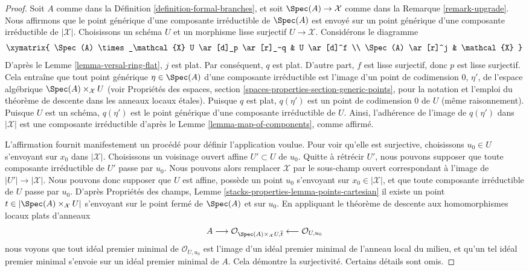 \begin{proof}
Soit $A$ comme dans la Définition \ref{definition-formal-branches}, et
soit $\Spec(A) \to \mathcal{X}$ comme dans la Remarque \ref{remark-upgrade}.
Nous affirmons que le point générique d'une composante irréductible de
$\Spec(A)$ est envoyé sur un point générique d'une composante irréductible
de $|\mathcal{X}|$. Choisissons un schéma $U$ et un morphisme
lisse surjectif $U \to \mathcal{X}$. Considérons le diagramme
$$
\xymatrix{
\Spec(A) \times_\mathcal{X} U \ar[d]_p \ar[r]_-q & U \ar[d]^f \\
\Spec(A) \ar[r]^j & \mathcal{X}
}
$$
D'après le Lemme \ref{lemma-versal-ring-flat}, $j$ est plat.
Par conséquent, $q$ est plat. D'autre part, $f$ est lisse surjectif,
donc $p$ est lisse surjectif. Cela entraîne que tout point générique
$\eta \in \Spec(A)$ d'une composante irréductible est l'image d'un
point de codimension $0$, $\eta'$, de l'espace algébrique
$\Spec(A) \times_\mathcal{X} U$ (voir
Propriétés des espaces, section \ref{spaces-properties-section-generic-points},
pour la notation et l'emploi du théorème de descente dans les anneaux locaux étales).
Puisque $q$ est plat, $q(\eta')$ est un point de codimension $0$ de $U$
(même raisonnement).
Puisque $U$ est un schéma, $q(\eta')$ est le point générique
d'une composante irréductible de $U$. Ainsi, l'adhérence de l'image
de $q(\eta')$ dans $|\mathcal{X}|$ est une composante irréductible
d'après le Lemme \ref{lemma-map-of-components}, comme affirmé.

\medskip\noindent
L'affirmation fournit manifestement un procédé pour définir l'application voulue.
Pour voir qu'elle est surjective, choisissons $u_0 \in U$ s'envoyant sur
$x_0$ dans $|\mathcal{X}|$. Choisissons un voisinage ouvert affine $U' \subset U$
de $u_0$. Quitte à rétrécir $U'$, nous pouvons supposer que toute
composante irréductible de $U'$ passe par $u_0$. Nous pouvons alors
remplacer $\mathcal{X}$ par le sous-champ ouvert correspondant à
l'image de $|U'| \to |\mathcal{X}|$. Nous pouvons donc supposer que $U$ est affine,
possède un point $u_0$ s'envoyant sur $x_0 \in |\mathcal{X}|$,
et que toute composante irréductible de $U$ passe par $u_0$.
D'après Propriétés des champs, Lemme
\ref{stacks-properties-lemma-points-cartesian}
il existe un point $t \in |\Spec(A) \times_\mathcal{X} U|$
s'envoyant sur le point fermé de $\Spec(A)$ et sur $u_0$.
En appliquant le théorème de descente aux homomorphismes locaux plats d'anneaux
$$
A \longrightarrow
\mathcal{O}_{\Spec(A) \times_\mathcal{X} U, \overline{t}}
\longleftarrow \mathcal{O}_{U, u_0}
$$
nous voyons que tout idéal premier minimal de $\mathcal{O}_{U, u_0}$
est l'image d'un idéal premier minimal de l'anneau local du milieu,
et qu'un tel idéal premier minimal s'envoie sur un idéal premier minimal de $A$.
Cela démontre la surjectivité. Certains détails sont omis.
\end{proof}


